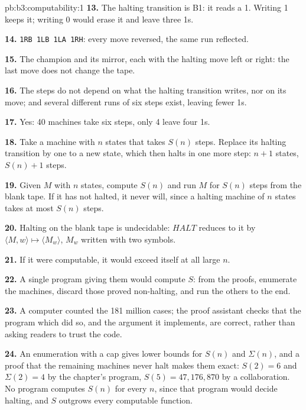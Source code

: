 \begin{solution}{pb:b3:computability:1}
\textbf{13.} The halting transition is B1: it reads a 1. Writing 1 keeps it; writing 0 would erase it and leave three 1s.

\textbf{14.} \texttt{1RB 1LB 1LA 1RH}: every move reversed, the same run reflected.

\textbf{15.} The champion and its mirror, each with the halting move left or right: the last move does not change the tape.

\textbf{16.} The steps do not depend on what the halting transition writes, nor on its move; and several different runs of six steps exist, leaving fewer 1s.

\textbf{17.} Yes: 40 machines take six steps, only 4 leave four 1s.

\textbf{18.} Take a machine with $n$ states that takes $S(n)$ steps. Replace its halting transition by one to a new state, which then halts in one more step: $n + 1$ states, $S(n) + 1$ steps.

\textbf{19.} Given $M$ with $n$ states, compute $S(n)$ and run $M$ for $S(n)$ steps from the blank tape. If it has not halted, it never will, since a halting machine of $n$ states takes at most $S(n)$ steps.

\textbf{20.} Halting on the blank tape is undecidable: $\mathit{HALT}$ reduces to it by $\langle M, w \rangle \mapsto \langle M_w \rangle$, $M_w$ written with two symbols.

\textbf{21.} If it were computable, it would exceed itself at all large $n$.

\textbf{22.} A single program giving them would compute $S$: from the proofs, enumerate the machines, discard those proved non-halting, and run the others to the end.

\textbf{23.} A computer counted the 181 million cases; the proof assistant checks that the program which did so, and the argument it implements, are correct, rather than asking readers to trust the code.

\textbf{24.} An enumeration with a cap gives lower bounds for $S(n)$ and $\Sigma(n)$, and a proof that the remaining machines never halt makes them exact: $S(2) = 6$ and $\Sigma(2) = 4$ by the chapter's program, $S(5) = 47{,}176{,}870$ by a collaboration. No program computes $S(n)$ for every $n$, since that program would decide halting, and $S$ outgrows every computable function.
\end{solution}

